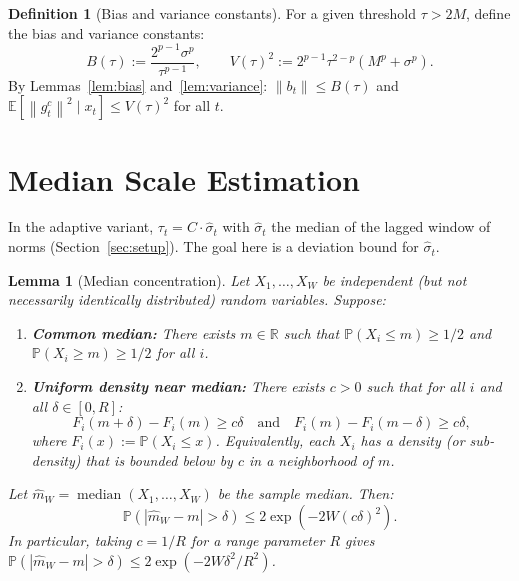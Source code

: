 \documentclass[11pt]{article}
\newtheorem{lemma}[theorem]{Lemma}
\theoremstyle{definition}
\newtheorem{definition}[theorem]{Definition}
\newcommand{\E}{\mathbb{E}}
\newcommand{\R}{\mathbb{R}}
\newcommand{\Prob}{\mathbb{P}}
\newcommand{\norm}[1]{\left\| #1 \right\|}
\newcommand{\abs}[1]{\left| #1 \right|}
\newcommand{\shat}{\hat{\sigma}}
\begin{document}
\begin{definition}[Bias and variance constants]\label{def:BV}
For a given threshold $\tau > 2M$, define the bias and variance constants:
\[
  B(\tau) := \frac{2^{p-1}\sigma^p}{\tau^{p-1}}, \qquad
  V(\tau)^2 := 2^{p-1}\tau^{2-p}(M^p + \sigma^p).
\]
By Lemmas~\ref{lem:bias} and~\ref{lem:variance}: $\norm{b_t} \leq B(\tau)$
and $\E[\norm{g_t^c}^2 \mid x_t] \leq V(\tau)^2$ for all $t$.
\end{definition}


\section{Median Scale Estimation}
\label{sec:median}

In the adaptive variant, $\tau_t = C \cdot \shat_t$ with $\shat_t$ the median of
the lagged window of norms (Section~\ref{sec:setup}). The goal here is a deviation bound for $\shat_t$.

\begin{lemma}[Median concentration]\label{lem:median}
Let $X_1, \ldots, X_W$ be independent (but not necessarily identically
distributed) random variables. Suppose:
\begin{enumerate}[label=(\roman*),noitemsep]
  \item \textbf{Common median:} There exists $m \in \R$ such that
    $\Prob(X_i \leq m) \geq 1/2$ and $\Prob(X_i \geq m) \geq 1/2$ for all $i$.
  \item \textbf{Uniform density near median:} There exists $c > 0$ such that
    for all $i$ and all $\delta \in [0, R]$:
    \[
      F_i(m + \delta) - F_i(m) \geq c\delta
      \quad\text{and}\quad
      F_i(m) - F_i(m - \delta) \geq c\delta,
    \]
    where $F_i(x) := \Prob(X_i \leq x)$. Equivalently, each $X_i$ has a
    density (or sub-density) that is bounded below by $c$ in a neighborhood
    of $m$.
\end{enumerate}
Let $\hat{m}_W = \operatorname{median}(X_1, \ldots, X_W)$ be the sample median. Then:
\[
  \Prob\!\left(\abs{\hat{m}_W - m} > \delta\right)
  \leq 2\exp\!\left(-2W(c\delta)^2\right).
\]
In particular, taking $c = 1/R$ for a range parameter $R$ gives
$\Prob(\abs{\hat{m}_W - m} > \delta) \leq 2\exp(-2W\delta^2/R^2)$.
\end{lemma}
\end{document}
